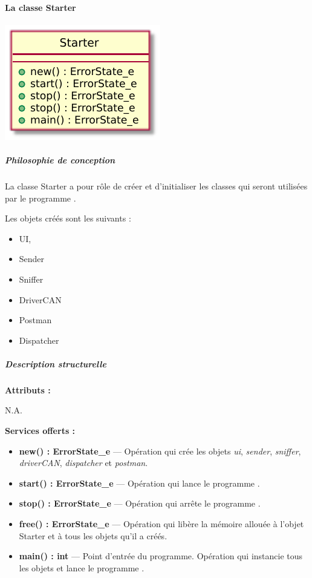 \paragraph{La classe Starter}

\begin{minipage}
    {\linewidth}
    \centering
    \includegraphics[width=0.30\linewidth]{../schemas/Conception_detaillee/classe_starter.pdf}
\end{minipage}

\subparagraph{Philosophie de conception \newline} 

\medspace

La classe Starter a pour rôle de créer et d'initialiser les classes qui seront utilisées par le programme {\nomLogiciel}.

Les objets créés sont les suivants :
\begin{itemize}
    \item UI,
    \item Sender
    \item Sniffer
    \item DriverCAN
    \item Postman
    \item Dispatcher
\end{itemize}

\subparagraph{Description structurelle \newline}

\medspace

\textbf{Attributs :}

N.A.

\textbf{Services offerts :}

\begin{itemize}
    \item \textbf{new() : ErrorState\_e} --- Opération qui crée les objets \textit{ui}, \textit{sender}, \textit{sniffer}, \textit{driverCAN}, \textit{dispatcher} et \textit{postman}.
    \item \textbf{start() : ErrorState\_e} --- Opération qui lance le programme {\nomLogiciel}.
    \item \textbf{stop() : ErrorState\_e} --- Opération qui arrête le programme {\nomLogiciel}.
    \item \textbf{free() : ErrorState\_e} --- Opération qui libère la mémoire allouée à l'objet Starter et à tous les objets qu'il a créés.
    \item \textbf{main() : int} --- Point d'entrée du programme. Opération qui instancie tous les objets et lance le programme {\nomLogiciel}.
\end{itemize}


